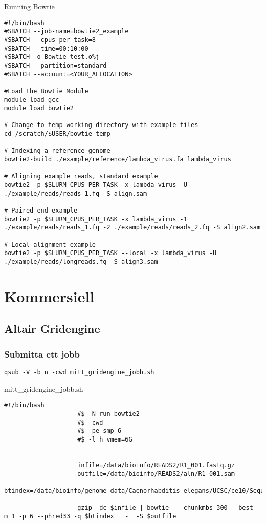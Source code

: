 \documentclass[
  letterpaper,
  DIV=11,
  numbers=noendperiod]{scrreprt}
\begin{document}
Running Bowtie

\begin{verbatim}
#!/bin/bash
#SBATCH --job-name=bowtie2_example
#SBATCH --cpus-per-task=8
#SBATCH --time=00:10:00
#SBATCH -o Bowtie_test.o%j
#SBATCH --partition=standard
#SBATCH --account=<YOUR_ALLOCATION>

#Load the Bowtie Module
module load gcc
module load bowtie2

# Change to temp working directory with example files
cd /scratch/$USER/bowtie_temp

# Indexing a reference genome
bowtie2-build ./example/reference/lambda_virus.fa lambda_virus

# Aligning example reads, standard example
bowtie2 -p $SLURM_CPUS_PER_TASK -x lambda_virus -U ./example/reads/reads_1.fq -S align.sam

# Paired-end example
bowtie2 -p $SLURM_CPUS_PER_TASK -x lambda_virus -1 ./example/reads/reads_1.fq -2 ./example/reads/reads_2.fq -S align2.sam

# Local alignment example
bowtie2 -p $SLURM_CPUS_PER_TASK --local -x lambda_virus -U ./example/reads/longreads.fq -S align3.sam
\end{verbatim}

\section{Kommersiell}\label{kommersiell}

\subsection{Altair Gridengine}\label{altair-gridengine}

\subsubsection{Submitta ett jobb}\label{submitta-ett-jobb-1}

\begin{verbatim}
qsub -V -b n -cwd mitt_gridengine_jobb.sh
\end{verbatim}

mitt\_gridengine\_jobb.sh

\begin{verbatim}
#!/bin/bash
                    #$ -N run_bowtie2
                    #$ -cwd
                    #$ -pe smp 6
                    #$ -l h_vmem=6G


                    infile=/data/bioinfo/READS2/R1_001.fastq.gz
                    outfile=/data/bioinfo/READS2/aln/R1_001.sam
                    btindex=/data/bioinfo/genome_data/Caenorhabditis_elegans/UCSC/ce10/Sequence/BowtieIndex/genome

                    gzip -dc $infile | bowtie  --chunkmbs 300 --best -m 1 -p 6 --phred33 -q $btindex   -  -S $outfile
\end{verbatim}
\end{document}
